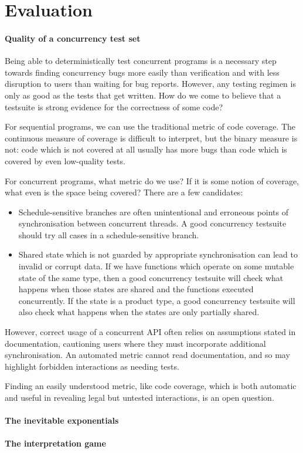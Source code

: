 \blindtext

\section{Evaluation}
\label{sec:conclusions-evaluation}

\paragraph{Quality of a concurrency test set}
Being able to deterministically test concurrent programs is a
necessary step towards finding concurrency bugs more easily than
verification and with less disruption to users than waiting for bug
reports.  However, any testing regimen is only as good as the tests
that get written.  How do we come to believe that a testsuite is
strong evidence for the correctness of some code?

For sequential programs, we can use the traditional metric of code
coverage.  The continuous measure of coverage is difficult to
interpret, but the binary measure is not: code which is not covered at
all usually has more bugs than code which is covered by even
low-quality tests\cite{ahmed2016}.

For concurrent programs, what metric do we use?  If it is some notion
of coverage, what even is the space being covered?  There are a few
candidates:

\begin{itemize}
\item Schedule-sensitive branches are often unintentional and
  erroneous points of synchronisation between concurrent
  threads\cite{huang2015ssb}.  A good concurrency testsuite should try
  all cases in a schedule-sensitive branch.

\item Shared state which is not guarded by appropriate synchronisation
  can lead to invalid or corrupt data.  If we have functions which
  operate on some mutable state of the same type, then a good
  concurrency testsuite will check what happens when those states are
  shared and the functions executed concurrently.  If the state is a
  product type, a good concurrency testsuite will also check what
  happens when the states are only partially shared.
\end{itemize}

However, correct usage of a concurrent API often relies on assumptions
stated in documentation, cautioning users where they must incorporate
additional synchronisation.  An automated metric cannot read
documentation, and so may highlight forbidden interactions as needing
tests.

Finding an easily understood metric, like code coverage, which is both
automatic and useful in revealing legal but untested interactions, is
an open question.

\paragraph{The inevitable exponentials}
\todo{\ldots}

\paragraph{The interpretation game}
\todo{\ldots}
